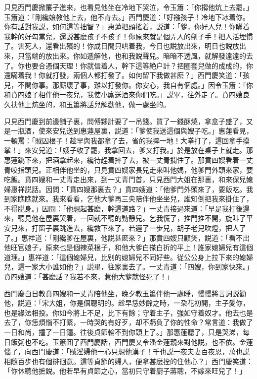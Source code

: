 只見西門慶掀簾子進來，也看見他坐在冷地下哭泣，令玉簫：「你搊他炕上去罷。」玉簫道：「剛纔娘教他上去，他不肯去。」西門慶道：「好襁孩子！冷地下冰着你。你有話對我説，如何這等拙智？」惠蓮把頭搖着，説道：「爹，你好人兒！你瞞着我幹的好勾當兒，還説甚麽孩子不孩子！你原來就是個弄人的劊子手！把人活埋慣了。害死人，還看出殯的！你成日間只哄着我，今日也説放出來，明日也説放出來，只當端的放出來。你如遞解他，也和我説聲兒。暗暗不透風，就解發遠遠的去了。你也要合憑個天理！你就信着人，幹下這等絶户計？把圈套兒做的成成的，你還瞞着我！你就打發，兩個人都打發了。如何留下我做甚麽？」西門慶笑道：「孩兒，不関你事。那廝壞了事，難以打發你。你安心，我自有個處。」因令玉簫：「你和賁四娘子相伴他一夜兒，我使小廝送酒來你們吃。」説畢，往外走了。賁四嫂良久扶他上炕坐的，和玉簫將話兒解勸他，做一處坐的。

只見西門慶到前邊舖子裏，問傅夥計要了一吊錢。買了一錢酥燒，拿盒子盛了，又是一瓶酒，使來安兒送到惠蓮屋裏，説道：「爹使我送這個與嫂子吃。」惠蓮看見，一頓罵：「賊囚根子！趁早與我都拿了去，省的我摔一地！大拳打了，這回拿手摸挲！」來安兒道：「嫂子收了罷，我拿回去，爹又打我。」於是放在桌子上就走。那惠蓮跳下來，把酒拿起來，纔待趕着摔了去，被一丈青攔住了。那賁四嫂看着一丈青咬指頭兒。正相伴他坐的，只見賁四嫂家長兒走來叫他媽，他爹門外頭來家，要吃飯。賁四嫂和一丈青走出來，到一丈青門首，只見西門大姐在那裏，和來保兒媳婦惠祥説話。因問：「賁四嫂那裏去？」賁四嫂道：「他爹門外頭來了，要飯吃。我到家瞧瞧就來。我來看看，乞他大爹再三央陪伴他坐坐兒，誰知倒把我來掛住了，不得脱身。」因問：「他想起甚麽，幹這道路？」一丈青接過來道：「早是我打後邊來，聽見他在屋裏哭着，一回就不聽的動靜兒。乞我慌了，推門推不開，旋叫了平安兒來，打窗子裏跳進去，纔救下來了。若遲了一步兒，胡子老兒吹燈，把人了了。」惠祥道：「剛纔爹在屋裏，他説甚麽來？」那賁四嫂只顧笑，説道：「看不出他旺官娘子，原來也是個辣菜根子，和他大爹白搽白折的平上！誰家媳婦兒有這個道理。」惠祥道：「這個媳婦兒，比别的媳婦兒不同好些。従公公身上拉下來的媳婦兒，這一家大小誰如他？」説畢，往家裏去了。一丈青道：「四嫂，你到家快來。」賁四嫂道：「甚麽話？我若不來，惹他大爹就怪死了！」

西門慶白日教賁四嫂和一丈青陪他坐，晚夕教玉簫伴他一處睡，慢慢將言詞説勸他，説道：「宋大姐，你是個聰明的。趁早恁妙齡之時，一朶花初開，主子愛你，也是緣法相投。你如今將上不足，比下有餘；守着主子，強如守着奴才。他去也是去了，你恁煩惱不打緊，一時哭的有好歹，却不虧負了你的性命？常言道：我做了一日和尚，撞了一日鐘。往後貞節輪不到你頭上了。」那惠蓮聽了，只是哭涕，每日飯粥也不吃。玉簫囬了西門慶話，西門慶又令潘金蓮親來對他説，也不依。金蓮惱了，向西門慶道：「賊淫婦他一心只想他漢子！千也説一夜夫妻百夜恩，萬也説相隨百步也有個徘徊意。這等貞節的婦人，便拿甚麽拴的住他心？」西門慶笑道：「你休聽他摭説。他若早有貞節之心，當初只守着廚子蔣聰，不嫁來旺兒了！」

